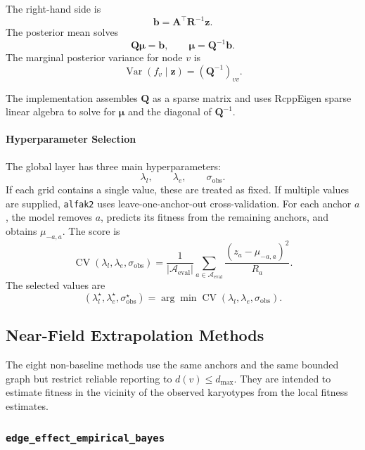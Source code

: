 \documentclass[11pt]{article}
\newcommand{\Var}{\operatorname{Var}}
\begin{document}
The right-hand side is
\[
  \bm b
  =
  \bm A^\top\bm R^{-1}\bm z.
\]
The posterior mean solves
\[
  \bm Q\bm\mu=\bm b,
  \qquad
  \bm \mu=\bm Q^{-1}\bm b.
\]
The marginal posterior variance for node $v$ is
\[
  \Var(f_v\mid \bm z)
  =
  (\bm Q^{-1})_{vv}.
\]

The implementation assembles $\bm Q$ as a sparse matrix and uses RcppEigen
sparse linear algebra to solve for $\bm \mu$ and the diagonal of
$\bm Q^{-1}$.

\paragraph{Hyperparameter Selection}

The global layer has three main hyperparameters:
\[
  \lambda_l,\qquad \lambda_e,\qquad \sigma_{\mathrm{obs}}.
\]
If each grid contains a single value, these are treated as fixed. If multiple
values are supplied, \texttt{alfak2} uses leave-one-anchor-out cross-validation.
For each anchor $a$, the model removes $a$, predicts its fitness from the
remaining anchors, and obtains $\mu_{-a,a}$. The score is
\[
  \operatorname{CV}(\lambda_l,\lambda_e,\sigma_{\mathrm{obs}})
  =
  \frac{1}{|\mathcal{A}_{\mathrm{eval}}|}
  \sum_{a\in\mathcal{A}_{\mathrm{eval}}}
  \frac{(z_a-\mu_{-a,a})^2}{R_a}.
\]
The selected values are
\[
  (\lambda_l^\star,\lambda_e^\star,\sigma_{\mathrm{obs}}^\star)
  =
  \arg\min
  \operatorname{CV}(\lambda_l,\lambda_e,\sigma_{\mathrm{obs}}).
\]

\subsection{Near-Field Extrapolation Methods}

The eight non-baseline methods use the same anchors and the same bounded graph
but restrict reliable reporting to $d(v)\le d_{\max}$. They are intended to
estimate fitness in the vicinity of the observed karyotypes from the local
fitness estimates.

\subsubsection{\texttt{edge\_effect\_empirical\_bayes}}
\end{document}
